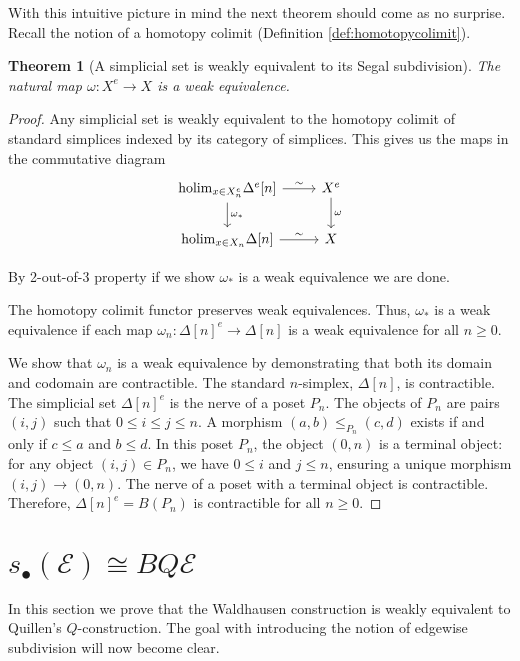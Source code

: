 \documentclass[12pt]{report}
\numberwithin{equation}{section}
\newtheorem{theorem}[dummy]{Theorem}
\begin{document}
	
	With this intuitive picture in mind the next theorem should come as no surprise. Recall the notion of a homotopy colimit (Definition \ref{def:homotopycolimit}).
	\begin{theorem}[A simplicial set is weakly equivalent to its Segal subdivision]
		The natural map \( \omega:X^e \to X \) is a weak equivalence.
	\end{theorem}
	\begin{proof}
		Any simplicial set is weakly equivalent to the homotopy colimit of standard simplices indexed by its category of simplices.
		This gives us the maps in the commutative diagram
		\[
		\begin{tikzcd}
			\mathrm{holim}_{x\in X^e_n} \Delta^e[n] \arrow{r}{\sim} \arrow{d}{\omega_*} & X^e \arrow{d}{\omega} \\
			\mathrm{holim}_{x \in X_n} \Delta[n] \arrow{r}{\sim} & X
		\end{tikzcd}
		\]
		
		By 2-out-of-3 property if we show \( \omega_* \) is a weak equivalence we are done. 
		
		The homotopy colimit functor preserves weak equivalences. Thus, \( \omega_* \) is a weak equivalence if each map \( \omega_n: \Delta[n]^e \to \Delta[n] \) is a weak equivalence for all \( n \ge 0 \).
		
		We show that \( \omega_n \) is a weak equivalence by demonstrating that both its domain and codomain are contractible.
		The standard \(n\)-simplex, \( \Delta[n] \), is contractible.
		The simplicial set \( \Delta[n]^e \) is the nerve of a poset \( P_n \). The objects of \( P_n \) are pairs \( (i,j) \) such that \( 0 \le i \le j \le n \). A morphism \( (a,b) \le_{P_n} (c,d) \) exists if and only if \( c \le a \) and \( b \le d \).
		In this poset \( P_n \), the object \( (0,n) \) is a terminal object: for any object \( (i,j) \in P_n \), we have \( 0 \le i \) and \( j \le n \), ensuring a unique morphism \( (i,j) \to (0,n) \). The nerve of a poset with a terminal object is contractible. Therefore, \( \Delta[n]^e = B(P_n) \) is contractible for all \( n \ge 0 \).
	\end{proof}
	
	\section{\( s_\bullet(\mathcal{E}) \cong BQ \mathcal{E} \)}
	In this section we prove that the Waldhausen construction is weakly equivalent to Quillen's \( Q \)-construction. The goal with introducing the notion of edgewise subdivision will now become clear.
	
\end{document}
